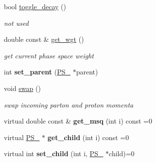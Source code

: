 \begin{DoxyCompactItemize}
\item 
\hypertarget{classPS__2_a5063384c1c8b5e500f33970c01712f59}{bool \hyperlink{classPS__2_a5063384c1c8b5e500f33970c01712f59}{toggle\-\_\-decay} ()}\label{classPS__2_a5063384c1c8b5e500f33970c01712f59}

\begin{DoxyCompactList}\small\item\em not used \end{DoxyCompactList}\item 
\hypertarget{classPS__2_a049e0480c37ac84a8319f19bcfb335ab}{double const \& \hyperlink{classPS__2_a049e0480c37ac84a8319f19bcfb335ab}{get\-\_\-wgt} ()}\label{classPS__2_a049e0480c37ac84a8319f19bcfb335ab}

\begin{DoxyCompactList}\small\item\em get current phase space weight \end{DoxyCompactList}\item 
\hypertarget{classPS__2_a743942dc8d537cfed9d229aad62aa96a}{int {\bfseries set\-\_\-parent} (\hyperlink{classPS__2}{P\-S\-\_} $\ast$parent)}\label{classPS__2_a743942dc8d537cfed9d229aad62aa96a}

\item 
\hypertarget{classPS__2_a429976f39133474f682af423e50560e4}{void \hyperlink{classPS__2_a429976f39133474f682af423e50560e4}{swap} ()}\label{classPS__2_a429976f39133474f682af423e50560e4}

\begin{DoxyCompactList}\small\item\em swap incoming parton and proton momenta \end{DoxyCompactList}\item 
\hypertarget{classPS__2_a5865322be9736bf043cc8bd1d5127a52}{virtual double const \& {\bfseries get\-\_\-msq} (int i) const =0}\label{classPS__2_a5865322be9736bf043cc8bd1d5127a52}

\item 
\hypertarget{classPS__2_af44e67d84bc53b126d720907adeaffc2}{virtual \hyperlink{classPS__2}{P\-S\-\_} $\ast$ {\bfseries get\-\_\-child} (int i) const =0}\label{classPS__2_af44e67d84bc53b126d720907adeaffc2}

\item 
\hypertarget{classPS__2_a74d62c9ae71d30741838408fabaf4ba3}{virtual int {\bfseries set\-\_\-child} (int i, \hyperlink{classPS__2}{P\-S\-\_} $\ast$child)=0}\label{classPS__2_a74d62c9ae71d30741838408fabaf4ba3}


\end{DoxyCompactItemize}
